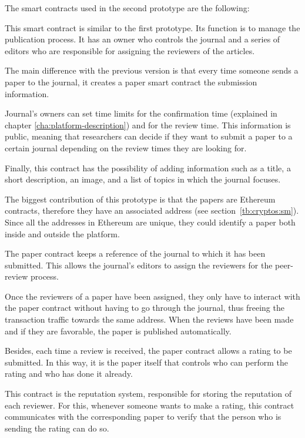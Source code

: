 The smart contracts used in the second prototype are the following:


This smart contract is similar to the first prototype. Its function is to manage
the publication process. It has an owner who controls the journal and a series
of editors who are responsible for assigning the reviewers of the articles.

The main difference with the previous version is that every time someone sends a
paper to the journal, it creates a paper smart contract the submission
information.

Journal's owners can set time limits for the confirmation time (explained in
chapter \ref{cha:platform-description}) and for the review time. This
information is public, meaning that researchers can decide if they want to
submit a paper to a certain journal depending on the review times they are
looking for.

Finally, this contract has the possibility of adding information such as a
title, a short description, an image, and a list of topics in which the journal
focuses.


The biggest contribution of this prototype is that the papers are Ethereum
contracts, therefore they have an associated address (see
section~\ref{tb:cryptos:sm}). Since all the addresses in Ethereum are unique,
they could identify a paper both inside and outside the platform.

The paper contract keeps a reference of the journal to which it has been
submitted. This allows the journal's editors to assign the reviewers for the
peer-review process.

Once the reviewers of a paper have been assigned, they only have to interact
with the paper contract without having to go through the journal, thus freeing
the transaction traffic towards the same address. When the reviews have been
made and if they are favorable, the paper is published automatically.

Besides, each time a review is received, the paper contract allows a rating to
be submitted. In this way, it is the paper itself that controls who can perform
the rating and who has done it already.


This contract is the reputation system, responsible for storing the reputation
of each reviewer. For this, whenever someone wants to make a rating, this
contract communicates with the corresponding paper to verify that the person who
is sending the rating can do so.


